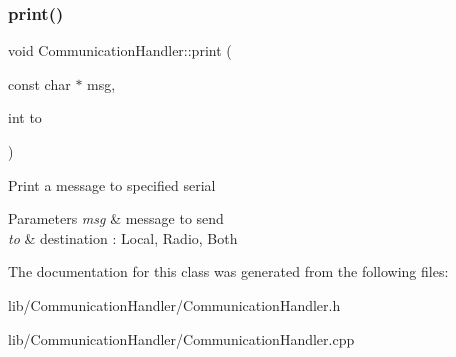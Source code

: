 \subsubsection{\texorpdfstring{print()}{print()}\hspace{0.1cm}{\footnotesize\ttfamily [2/2]}}
{\footnotesize\ttfamily void Communication\+Handler\+::print (\begin{DoxyParamCaption}\item[{const char $\ast$}]{msg,  }\item[{int}]{to }\end{DoxyParamCaption})}

Print a message to specified serial 
\begin{DoxyParams}{Parameters}
{\em msg} & message to send \\
\hline
{\em to} & destination \+: Local, Radio, Both \\
\hline
\end{DoxyParams}


The documentation for this class was generated from the following files\+:\begin{DoxyCompactItemize}
\item 
lib/\+Communication\+Handler/Communication\+Handler.\+h\item 
lib/\+Communication\+Handler/Communication\+Handler.\+cpp\end{DoxyCompactItemize}
